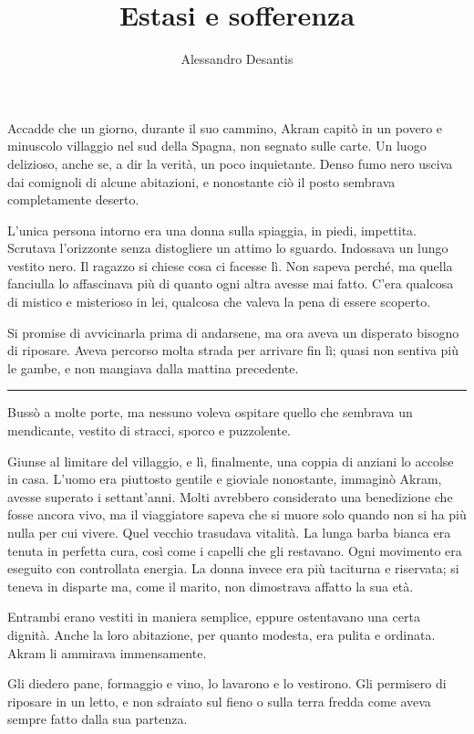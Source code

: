 \documentclass[a4paper,10pt]{memoir}
\title{Estasi e sofferenza}
\author{Alessandro Desantis}
\date{}
\begin{document}
\begin{titlingpage}
\maketitle
\end{titlingpage}

Accadde che un giorno, durante il suo cammino, Akram capitò in un povero e
minuscolo villaggio nel sud della Spagna, non segnato sulle carte. Un luogo
delizioso, anche se, a dir la verità, un poco inquietante. Denso fumo nero
usciva dai comignoli di alcune abitazioni, e nonostante ciò il posto sembrava
completamente deserto.

L'unica persona intorno era una donna sulla spiaggia, in piedi, impettita.
Scrutava l'orizzonte senza distogliere un attimo lo sguardo. Indossava un lungo
vestito nero. Il ragazzo si chiese cosa ci facesse lì. Non sapeva perché, ma
quella fanciulla lo affascinava più di quanto ogni altra avesse mai fatto. C'era
qualcosa di mistico e misterioso in lei, qualcosa che valeva la pena di essere
scoperto.

Si promise di avvicinarla prima di andarsene, ma ora aveva un disperato bisogno
di riposare. Aveva percorso molta strada per arrivare fin lì; quasi non sentiva
più le gambe, e non mangiava dalla mattina precedente.

\plainbreak{1}

Bussò a molte porte, ma nessuno voleva ospitare quello che sembrava un
mendicante, vestito di stracci, sporco e puzzolente.

Giunse al limitare del villaggio, e lì, finalmente, una coppia di anziani lo
accolse in casa. L'uomo era piuttosto gentile e gioviale nonostante, immaginò
Akram, avesse superato i settant'anni. Molti avrebbero considerato una
benedizione che fosse ancora vivo, ma il viaggiatore sapeva che si muore solo
quando non si ha più nulla per cui vivere. Quel vecchio trasudava vitalità. La
lunga barba bianca era tenuta in perfetta cura, così come i capelli che gli
restavano. Ogni movimento era eseguito con controllata energia. La donna invece
era più taciturna e riservata; si teneva in disparte ma, come il marito, non
dimostrava affatto la sua età.

Entrambi erano vestiti in maniera semplice, eppure ostentavano una certa
dignità. Anche la loro abitazione, per quanto modesta, era pulita e ordinata.
Akram li ammirava immensamente.

Gli diedero pane, formaggio e vino, lo lavarono e lo vestirono. Gli permisero di
riposare in un letto, e non sdraiato sul fieno o sulla terra fredda come aveva
sempre fatto dalla sua partenza.
\end{document}
